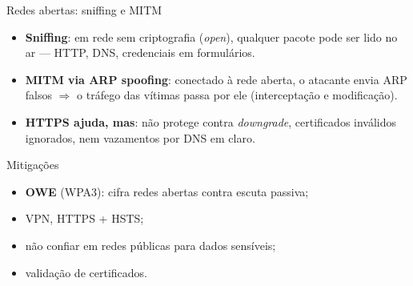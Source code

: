\documentclass[aspectratio=169,11pt]{beamer}
\begin{document}
\begin{frame}{Redes abertas: sniffing e MITM}
  \begin{itemize}
    \item \textbf{Sniffing}: em rede sem criptografia (\emph{open}), qualquer pacote pode ser lido no ar --- HTTP, DNS, credenciais em formulários.
    \item \textbf{MITM via ARP spoofing}: conectado à rede aberta, o atacante envia ARP falsos $\Rightarrow$ o tráfego das vítimas passa por ele (interceptação e modificação).
    \item \textbf{HTTPS ajuda, mas}: não protege contra \emph{downgrade}, certificados inválidos ignorados, nem vazamentos por DNS em claro.
  \end{itemize}
  \begin{block}{Mitigações}
    \begin{itemize}
      \item \textbf{OWE} (WPA3): cifra redes abertas contra escuta passiva;
      \item VPN, HTTPS + HSTS;
      \item não confiar em redes públicas para dados sensíveis;
      \item validação de certificados.
    \end{itemize}
  \end{block}
\end{frame}
\end{document}
